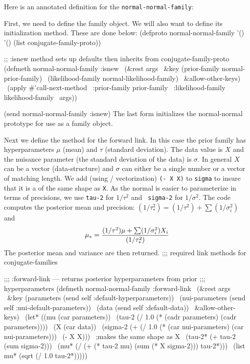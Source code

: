 \medskip

Here is an annotated definition for the {\tt normal-normal-family\/}:

First, we need to define the family object.  We will also want to
define its initialization method.  These are done below:
\begincode
(defproto normal-normal-family '() '() (list conjugate-family-proto))

;; :isnew method sets up defaults then inherits from conjugate-family-proto
(defmeth normal-normal-family :isnew
\         (\&rest args
\	  \&key  (prior-family normal-prior-family)
\	        (likelihood-family normal-likelihood-family)
\	  \&allow-other-keys)
\ (apply \#'call-next-method
\	:prior-family prior-family
\	:likelihood-family likelihood-family 
\	args))

(send normal-normal-family :isnew)
\endcode
The last form initializes the normal-normal prototype for use as a
family object.

Next we define the method for the forward link.  In this case the
prior family has hyperparameters $\mu$ (mean) and $\tau$ (standard
deviation).  The data value is $X$ and the nuisance parameter (the
standard deviation of the data) is $\sigma$.  In general $X$ can be a
vector (data-structure) and $\sigma$ can either be a single number or
a vector of matching length.  We add (using \lispstat/ vectorization)
{\tt (- X X)\/} to {\tt sigma\/} to insure that it is a of the same
shape as {\tt X\/}.  As the normal is easier to parameterize
in terms of precisions, we use {\tt tau-2\/} for $1/\tau^2$ and {\tt
sigma-2\/} for $1/\sigma^2$.  The code computes the posterior mean and
precision: $(1/\tau_*^2) = (1/\tau^2) + \sum (1/\sigma_i^2)$ and 
$$ \mu_* = { (1/\tau^2) \mu + \sum (1/\sigma_i^2) X_i \over
(1/\tau_*^2) } $$  The posterior mean and variance are then returned.
\begincode
;;; required link methods for conjugate-families

;;; :forward-link --- returns posterior hyperparameters from prior
;;; hyperparameters 
(defmeth normal-normal-family :forward-link
\  	(\&rest args
\	 \&key  (parameters (send self :default-hyperparameters))
\	       (nui-parameters (send self :nui-default-parameters))
\	       (data (send self :default-data))
\	 \&allow-other-keys)
\  (let* ((mu (car parameters))
\	 (tau-2 (/ 1.0 (* (cadr parameters) (cadr parameters))))
\	 (X (car data))
\	 (sigma-2 (+ (/ 1.0 (* (car nui-parameters) (car nui-parameters)))
\		     (- X X)))
\					;makes the same shape as X
\	 (tau-2* (+ tau-2 (sum sigma-2)))
\	 (mu* (/ (+ (* tau-2 mu) (sum (* X sigma-2))) tau-2*)))
\    (list mu* (sqrt (/ 1.0 tau-2*)))))
\endcode

